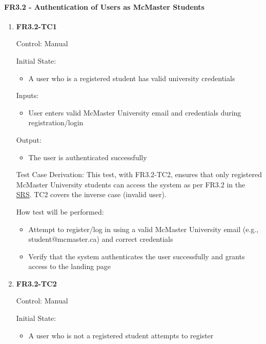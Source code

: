 \documentclass[12pt, titlepage]{article}
\begin{document}
\paragraph{FR3.2 - Authentication of Users as McMaster Students}

\begin{enumerate}
    \item{\textbf{FR3.2-TC1}}
    \hypertarget{FR3.2-TC1}{}
    
    Control: Manual
    
    Initial State:
    \begin{itemize}
        \item A user who is a registered student has valid university credentials
    \end{itemize}
    
    Inputs: 
    \begin{itemize}
        \item User enters valid McMaster University email and credentials during registration/login
    \end{itemize}
    
    Output: 
    \begin{itemize}
        \item The user is authenticated successfully
    \end{itemize}
    
    Test Case Derivation: This test, with FR3.2-TC2, ensures that only registered McMaster University students can access the system as per FR3.2 in the \href{https://shorturl.at/FdAgR}{SRS}. TC2 covers the inverse case (invalid user).
    
    How test will be performed:
    \begin{itemize}
        \item Attempt to register/log in using a valid McMaster University email (e.g., student@mcmaster.ca) and correct credentials
        \item Verify that the system authenticates the user successfully and grants access to the landing page
    \end{itemize}

    \item{\textbf{FR3.2-TC2}}
    \hypertarget{FR3.2-TC2}{}
    
    Control: Manual
    
    Initial State:
    \begin{itemize}
        \item A user who is not a registered student attempts to register
    \end{itemize}
    

\end{enumerate}
\end{document}
